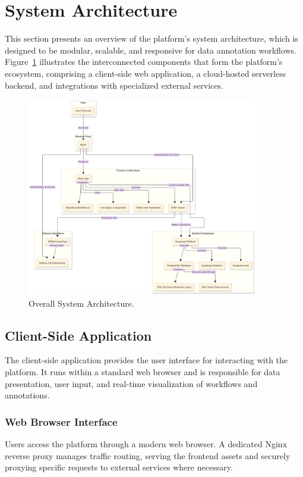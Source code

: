 \section{System Architecture}
This section presents an overview of the platform's system architecture, which is designed to be modular, scalable, and responsive for data annotation workflows. Figure~\ref{fig:system-architecture} illustrates the interconnected components that form the platform's ecosystem, comprising a client-side web application, a cloud-hosted serverless backend, and integrations with specialized external services.

\begin{figure}[ht]
\centering
\includegraphics[width=0.9\textwidth]{content/resources/architecture.png} %
\caption{Overall System Architecture.}
\label{fig:system-architecture}
\end{figure}

\subsection{Client-Side Application}
The client-side application provides the user interface for interacting with the platform. It runs within a standard web browser and is responsible for data presentation, user input, and real-time visualization of workflows and annotations.

\subsubsection{Web Browser Interface}
Users access the platform through a modern web browser. A dedicated Nginx reverse proxy manages traffic routing, serving the frontend assets and securely proxying specific requests to external services where necessary.

